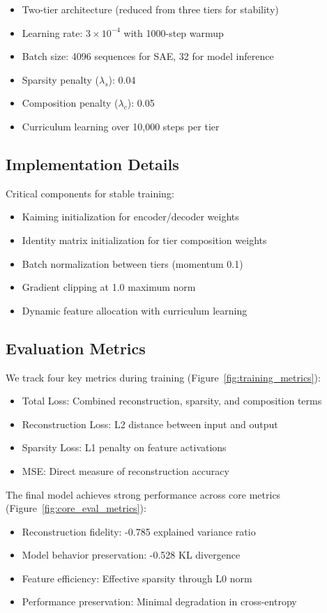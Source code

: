 \documentclass{article} %
\begin{document}
\begin{itemize}
    \item Two-tier architecture (reduced from three tiers for stability)
    \item Learning rate: $3\times10^{-4}$ with 1000-step warmup
    \item Batch size: 4096 sequences for SAE, 32 for model inference
    \item Sparsity penalty ($\lambda_s$): 0.04
    \item Composition penalty ($\lambda_c$): 0.05
    \item Curriculum learning over 10,000 steps per tier
\end{itemize}

\subsection{Implementation Details}
Critical components for stable training:
\begin{itemize}
    \item Kaiming initialization for encoder/decoder weights
    \item Identity matrix initialization for tier composition weights
    \item Batch normalization between tiers (momentum 0.1)
    \item Gradient clipping at 1.0 maximum norm
    \item Dynamic feature allocation with curriculum learning
\end{itemize}

\subsection{Evaluation Metrics}
We track four key metrics during training (Figure~\ref{fig:training_metrics}):
\begin{itemize}
    \item Total Loss: Combined reconstruction, sparsity, and composition terms
    \item Reconstruction Loss: L2 distance between input and output
    \item Sparsity Loss: L1 penalty on feature activations
    \item MSE: Direct measure of reconstruction accuracy
\end{itemize}

The final model achieves strong performance across core metrics (Figure~\ref{fig:core_eval_metrics}):
\begin{itemize}
    \item Reconstruction fidelity: -0.785 explained variance ratio
    \item Model behavior preservation: -0.528 KL divergence
    \item Feature efficiency: Effective sparsity through L0 norm
    \item Performance preservation: Minimal degradation in cross-entropy
\end{itemize}
\end{document}
